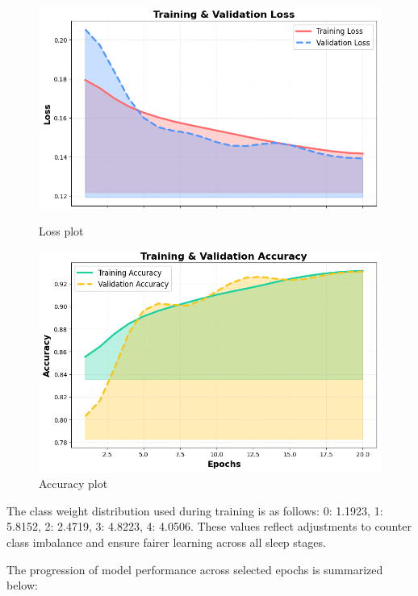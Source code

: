 \begin{figure}[H]
	\centering
	\begin{minipage}[b]{0.45\linewidth}
		\includegraphics[width=\linewidth]{img/paper_3/loss plot}
		\caption{Loss plot}
		\label{fig:loss-plot}
	\end{minipage}
	\hfill
	\begin{minipage}[b]{0.45\linewidth}
		\includegraphics[width=\linewidth]{img/paper_3/accuracy plot}
		\caption{Accuracy plot}
		\label{fig:accuracy-plot}
	\end{minipage}
\end{figure}

The class weight distribution used during training is as follows: 0: 1.1923, 1: 5.8152, 2: 2.4719, 3: 4.8223, 4: 4.0506. These values reflect adjustments to counter class imbalance and ensure fairer learning across all sleep stages.

The progression of model performance across selected epochs is summarized below:

